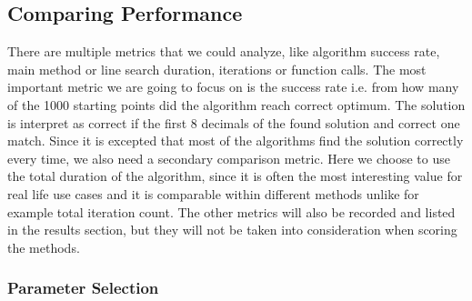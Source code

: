 \documentclass[a4paper,english,titlepage,12pt]{article}
\newcommand{\vect}[1]{\ensuremath{\mathbf{#1}}}
\begin{document}
\subsection{Comparing Performance}


There are multiple metrics that we could analyze, like algorithm success rate, main method or line search duration, iterations or function calls. The most important metric we are going to focus on is the success rate i.e. from how many of the 1000 starting points did the algorithm reach correct optimum. The solution is interpret as correct if the first 8 decimals of the found solution and correct one match.
Since it is excepted that most of the algorithms find the solution correctly every time, we also need a secondary comparison metric. Here we choose to use the total duration of the algorithm, since it is often the most interesting value for real life use cases and it is comparable within different methods unlike for example total iteration count. The other metrics will also be recorded and listed in the results section, but they will not be taken into consideration when scoring the methods.



\subsubsection{Parameter Selection}
\end{document}
